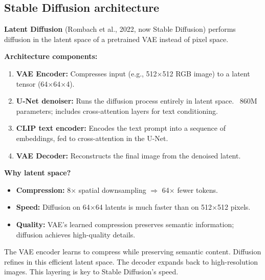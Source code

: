 \subsection{Stable Diffusion architecture}

\begin{paperbox}[title={Latent Diffusion Models (LDM)}]
\textbf{Latent Diffusion} (Rombach et al., 2022, now Stable Diffusion) performs diffusion in the latent space of a pretrained VAE instead of pixel space.

\textbf{Architecture components:}
\begin{enumerate}
  \item \textbf{VAE Encoder:} Compresses input (e.g., 512$\times$512 RGB image) to a latent tensor (64$\times$64$\times$4).
  \item \textbf{U-Net denoiser:} Runs the diffusion process entirely in latent space. ~860M parameters; includes cross-attention layers for text conditioning.
  \item \textbf{CLIP text encoder:} Encodes the text prompt into a sequence of embeddings, fed to cross-attention in the U-Net.
  \item \textbf{VAE Decoder:} Reconstructs the final image from the denoised latent.
\end{enumerate}

\textbf{Why latent space?}
\begin{itemize}
  \item \textbf{Compression:} 8$\times$ spatial downsampling $\Rightarrow$ 64$\times$ fewer tokens.
  \item \textbf{Speed:} Diffusion on 64$\times$64 latents is much faster than on 512$\times$512 pixels.
  \item \textbf{Quality:} VAE's learned compression preserves semantic information; diffusion achieves high-quality details.
\end{itemize}

\begin{intuitionbox}
The VAE encoder learns to compress while preserving semantic content. Diffusion refines in this efficient latent space. The decoder expands back to high-resolution images. This layering is key to Stable Diffusion's speed.
\end{intuitionbox}
\end{paperbox}

